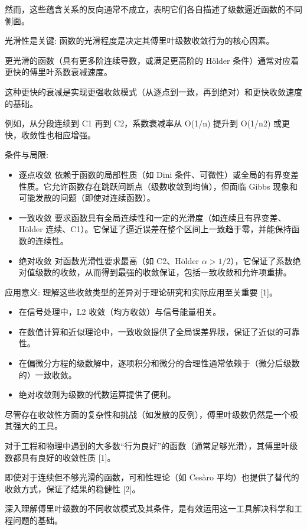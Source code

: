 然而，这些蕴含关系的反向通常不成立，表明它们各自描述了级数逼近函数的不同侧面。

光滑性是关键: 函数的光滑程度是决定其傅里叶级数收敛行为的核心因素。

更光滑的函数（具有更多阶连续导数，或满足更高阶的 Hölder 条件）通常对应着更快的傅里叶系数衰减速度。

这种更快的衰减是实现更强收敛模式（从逐点到一致，再到绝对）和更快收敛速度的基础。

例如，从分段连续到 C1 再到 C2，系数衰减率从 O(1/n) 提升到 O(1/n2) 或更快，收敛性也相应增强。

条件与局限:

\begin{itemize}
	\item 逐点收敛 依赖于函数的局部性质（如 Dini 条件、可微性）或全局的有界变差性质。它允许函数存在跳跃间断点（级数收敛到均值），但面临 Gibbs 现象和可能发散的问题（即使对连续函数）。
	\item 一致收敛 要求函数具有全局连续性和一定的光滑度（如连续且有界变差、Hölder 连续、C1）。它保证了逼近误差在整个区间上一致趋于零，并能保持函数的连续性。
	\item 绝对收敛 对函数光滑性要求最高（如 C2、Hölder $\alpha>1/2$），它保证了系数绝对值级数的收敛，从而得到最强的收敛保证，包括一致收敛和允许项重排。
\end{itemize}

应用意义: 理解这些收敛类型的差异对于理论研究和实际应用至关重要 [1]。

\begin{itemize}
	\item 在信号处理中，L2 收敛（均方收敛）与信号能量相关。
	\item 在数值计算和近似理论中，一致收敛提供了全局误差界限，保证了近似的可靠性。
	\item 在偏微分方程的级数解中，逐项积分和微分的合理性通常依赖于（微分后级数的）一致收敛。
	\item 绝对收敛则为级数的代数运算提供了便利。
\end{itemize}

尽管存在收敛性方面的复杂性和挑战（如发散的反例），傅里叶级数仍然是一个极其强大的工具。

对于工程和物理中遇到的大多数“行为良好”的函数（通常足够光滑），其傅里叶级数都具有良好的收敛性质 [1]。

即使对于连续但不够光滑的函数，可和性理论（如 Cesàro 平均）也提供了替代的收敛方式，保证了结果的稳健性 [2]。

深入理解傅里叶级数的不同收敛模式及其条件，是有效运用这一工具解决科学和工程问题的基础。
